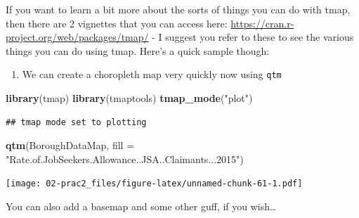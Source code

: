 \documentclass[]{book}
\newenvironment{Shaded}{\begin{snugshade}}{\end{snugshade}}
\newcommand{\DataTypeTok}[1]{\textcolor[rgb]{0.13,0.29,0.53}{#1}}
\newcommand{\KeywordTok}[1]{\textcolor[rgb]{0.13,0.29,0.53}{\textbf{#1}}}
\newcommand{\NormalTok}[1]{#1}
\newcommand{\StringTok}[1]{\textcolor[rgb]{0.31,0.60,0.02}{#1}}
\providecommand{\tightlist}{%
  \setlength{\itemsep}{0pt}\setlength{\parskip}{0pt}}
\begin{document}
If you want to learn a bit more about the sorts of things you can do with tmap, then there are 2 vignettes that you can access here: \url{https://cran.r-project.org/web/packages/tmap/} - I suggest you refer to these to see the various things you can do using tmap. Here's a quick sample though:

\begin{enumerate}
\def\labelenumi{\arabic{enumi}.}
\setcounter{enumi}{10}
\tightlist
\item
  We can create a choropleth map very quickly now using \texttt{qtm}
\end{enumerate}

\begin{Shaded}
\begin{Highlighting}[]
\KeywordTok{library}\NormalTok{(tmap)}
\KeywordTok{library}\NormalTok{(tmaptools)}
\KeywordTok{tmap_mode}\NormalTok{(}\StringTok{"plot"}\NormalTok{)}
\end{Highlighting}
\end{Shaded}

\begin{verbatim}
## tmap mode set to plotting
\end{verbatim}

\begin{Shaded}
\begin{Highlighting}[]
\KeywordTok{qtm}\NormalTok{(BoroughDataMap, }\DataTypeTok{fill =} \StringTok{"Rate.of.JobSeekers.Allowance..JSA..Claimants...2015"}\NormalTok{)}
\end{Highlighting}
\end{Shaded}

\texttt{[image: 02-prac2\_files/figure-latex/unnamed-chunk-61-1.pdf]}

You can also add a basemap and some other guff, if you wish\ldots{}
\end{document}
